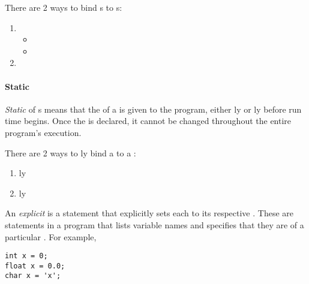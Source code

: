 There are 2 ways to bind s to s:
\begin{enumerate}[noitemsep]
\item {}
  \begin{itemize}[noitemsep]
  \item {}
  \item {}
  \end{itemize}
\item {}
\end{enumerate}

\paragraph{Static  }\label{par:Static_Variable_Type_Binding}
\begin{definition}[Static]\label{def:Static_Variable_Type_Binding}
  \emph{Static}  of s means that the  of a  is given to the program, either ly or ly before run time begins.
  Once the  is declared, it cannot be changed throughout the entire program's execution.

  There are 2 ways to ly bind a  to a :
  \begin{enumerate}[noitemsep]
  \item {}ly
  \item {}ly
  \end{enumerate}
\end{definition}

\begin{definition}[Explicit]\label{def:Explicit_Static_Variable_Type_Binding}
  An \emph{explicit}    is a statement that explicitly sets each  to its respective .
  These are statements in a program that lists variable names and specifies that they are of a particular .
  For example,
\begin{verbatim}
int x = 0;
float x = 0.0;
char x = 'x';
\end{verbatim}
\end{definition}

